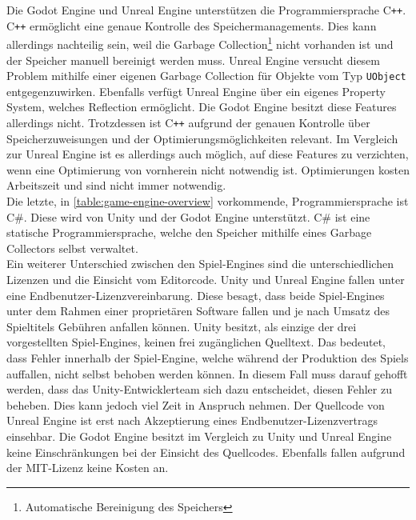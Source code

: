 Die Godot Engine und Unreal Engine unterstützen die Programmiersprache C\texttt{++}.
C\texttt{++} ermöglicht eine genaue Kontrolle des Speichermanagements.
Dies kann allerdings nachteilig sein, weil die Garbage Collection\footnote{Automatische Bereinigung des Speichers} nicht vorhanden ist und der Speicher manuell bereinigt werden muss.
Unreal Engine versucht diesem Problem mithilfe einer eigenen Garbage Collection für Objekte vom Typ \texttt{UObject} entgegenzuwirken\cite{unreal-garbage}.
Ebenfalls verfügt Unreal Engine über ein eigenes Property System, welches Reflection ermöglicht\cite{unreal-reflection}.
Die Godot Engine besitzt diese Features allerdings nicht.
Trotzdessen ist C\texttt{++} aufgrund der genauen Kontrolle über Speicherzuweisungen und der Optimierungsmöglichkeiten relevant.
Im Vergleich zur Unreal Engine ist es allerdings auch möglich, auf diese Features zu verzichten, wenn eine Optimierung von vornherein nicht notwendig ist.
Optimierungen kosten Arbeitszeit und sind nicht immer notwendig.\\

Die letzte, in \autoref{table:game-engine-overview} vorkommende, Programmiersprache ist C\#.
Diese wird von Unity und der Godot Engine unterstützt.
C\# ist eine statische Programmiersprache, welche den Speicher mithilfe eines Garbage Collectors selbst verwaltet.\\

Ein weiterer Unterschied zwischen den Spiel-Engines sind die unterschiedlichen Lizenzen und die Einsicht vom Editorcode.
Unity und Unreal Engine fallen unter eine Endbenutzer-Lizenzvereinbarung.
Diese besagt, dass beide Spiel-Engines unter dem Rahmen einer proprietären Software fallen und je nach Umsatz des Spieltitels Gebühren anfallen können\cite{unity-price}\cite{unreal-price}.
Unity besitzt, als einzige der drei vorgestellten Spiel-Engines, keinen frei zugänglichen Quelltext.
Das bedeutet, dass Fehler innerhalb der Spiel-Engine, welche während der Produktion des Spiels auffallen, nicht selbst behoben werden können.
In diesem Fall muss darauf gehofft werden, dass das Unity-Entwicklerteam sich dazu entscheidet, diesen Fehler zu beheben.
Dies kann jedoch viel Zeit in Anspruch nehmen. Der Quellcode von Unreal Engine ist erst nach Akzeptierung eines Endbenutzer-Lizenzvertrags einsehbar.
Die Godot Engine besitzt im Vergleich zu Unity und Unreal Engine keine Einschränkungen bei der Einsicht des Quellcodes.
Ebenfalls fallen aufgrund der MIT-Lizenz keine Kosten an. \\

